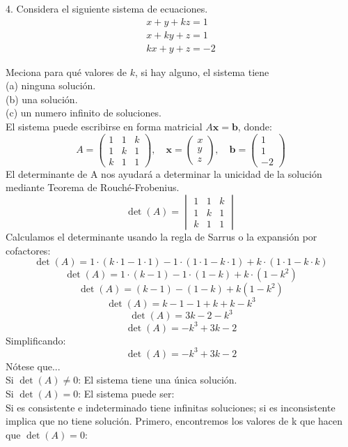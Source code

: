 4. Considera el siguiente sistema de ecuaciones.
\[
\begin{array}{l}
x+y+k z=1 \\
x+k y+z=1 \\
k x+y+z=-2
\end{array}
\]

\begin{solution}
Meciona para qué valores de \( k \), si hay alguno, el sistema tiene \\
(a) ninguna solución. \\
(b) una solución. \\
(c) un numero infinito de soluciones. \\

El sistema puede escribirse en forma matricial \( A \mathbf{x} = \mathbf{b} \), donde:
\[
A = \begin{pmatrix}
1 & 1 & k \\
1 & k & 1 \\
k & 1 & 1
\end{pmatrix}, \quad
\mathbf{x} = \begin{pmatrix}
x \\
y \\
z
\end{pmatrix}, \quad
\mathbf{b} = \begin{pmatrix}
1 \\
1 \\
-2
\end{pmatrix}
\]
El determinante de A nos ayudará a determinar la unicidad de la solución mediante Teorema de Rouché-Frobenius.
\[
\det(A) = \begin{vmatrix}
1 & 1 & k \\
1 & k & 1 \\
k & 1 & 1
\end{vmatrix}
\]
Calculamos el determinante usando la regla de Sarrus o la expansión por cofactores:
\[
\det(A) = 1 \cdot (k \cdot 1 - 1 \cdot 1) - 1 \cdot (1 \cdot 1 - k \cdot 1) + k \cdot (1 \cdot 1 - k \cdot k)
\]
\[
\det(A) = 1 \cdot (k - 1) - 1 \cdot (1 - k) + k \cdot (1 - k^2)
\]
\[
\det(A) = (k - 1) - (1 - k) + k (1 - k^2)
\]
\[
\det(A) = k - 1 - 1 + k + k - k^3
\]
\[
\det(A) = 3k - 2 - k^3
\]
\[
\det(A) = -k^3 + 3k - 2
\]
Simplificando:
\[
\det(A) = -k^3 + 3k - 2
\]
Nótese que...\\
Si \( \det(A) \neq 0 \): El sistema tiene una única solución. \\
Si \( \det(A) = 0 \): El sistema puede ser: \\
Si es consistente e indeterminado tiene infinitas soluciones; si es inconsistente implica que no tiene solución. Primero, encontremos los valores de k que hacen que \( \det(A) = 0 \):

\end{solution}
